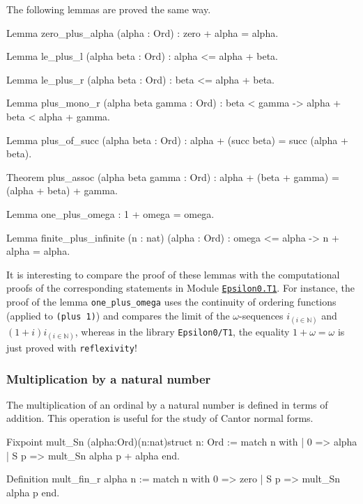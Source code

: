 {The following lemmas are proved the same way.

 \begin{Coqsrc}

Lemma zero_plus_alpha (alpha : Ord) : zero + alpha = alpha.

Lemma le_plus_l (alpha beta : Ord) : alpha <= alpha + beta.

Lemma le_plus_r (alpha beta : Ord) :  beta <= alpha + beta.

Lemma plus_mono_r (alpha beta gamma : Ord) : 
    beta < gamma -> alpha + beta < alpha + gamma.

Lemma plus_of_succ (alpha beta : Ord) :
    alpha + (succ beta) = succ (alpha + beta).

Theorem plus_assoc (alpha beta gamma : Ord) :
  alpha + (beta + gamma) = (alpha + beta) + gamma.

Lemma one_plus_omega :  1 + omega = omega.

Lemma finite_plus_infinite (n : nat) (alpha : Ord) :
  omega <= alpha -> n + alpha = alpha.
\end{Coqsrc} 


It is interesting to compare the proof of these lemmas with the
computational proofs of the corresponding statements in Module
\href{../theories/html/hydras.Epsilon0.T1.html}%
{\texttt{Epsilon0.T1}}. 
For instance, the proof of the lemma 
\texttt{one\_plus\_omega} uses the continuity of ordering functions (applied to  \texttt{(plus 1)}) and compares the limit of the $\omega$-sequences $i_{(i \in \mathbb{N})}$ and
$(1+i)i_{(i \in \mathbb{N})}$, whereas in the library  \texttt{Epsilon0/T1}, the equality 
$1+\omega=\omega$ is just proved with \texttt{reflexivity}!



\subsubsection{Multiplication by a natural number}

The multiplication of an ordinal by a natural number is defined in terms of addition.
This operation is useful for the study of Cantor normal forms.

\begin{Coqsrc}
Fixpoint mult_Sn (alpha:Ord)(n:nat){struct n}: Ord :=
 match n with 
            | 0 => alpha
            | S p => mult_Sn  alpha p + alpha
 end.

Definition mult_fin_r alpha n :=
  match n with
      0 => zero
    | S p => mult_Sn alpha p
  end.


\end{Coqsrc}}
